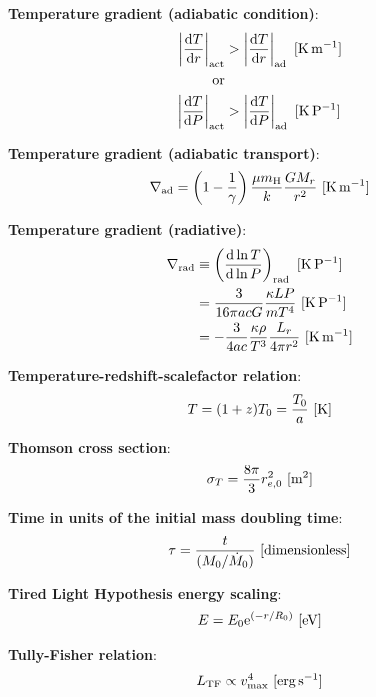 \documentclass[a4paper,10pt]{article}
\begin{document}
{\noindent}\textbf{Temperature gradient (adiabatic condition)}:
\begin{align*}
    \left\lvert\frac{{\rm d}T}{{\rm d}r}\right\rvert_{\rm act} &> \left\lvert\frac{{\rm d}T}{{\rm d}r}\right\rvert_{\rm ad} ~ [{\rm K\,m^{-1}}] \\
    {\rm or} \\
    \left\lvert\frac{{\rm d}T}{{\rm d}P}\right\rvert_{\rm act} &> \left\lvert\frac{{\rm d}T}{{\rm d}P}\right\rvert_{\rm ad} ~ [{\rm K\,P^{-1}}]
\end{align*}

{\noindent}\textbf{Temperature gradient (adiabatic transport)}:
\begin{align*}
    \nabla_{\rm ad} = \left(1-\frac{1}{\gamma}\right) \frac{\mu m_{\rm H}}{k}\frac{GM_r}{r^2} ~ [{\rm K\,m^{-1}}]
\end{align*}

{\noindent}\textbf{Temperature gradient (radiative)}:
\begin{align*}
    \nabla_{\rm rad} &\equiv \left(\frac{{\rm d}\ln T}{{\rm d}\ln P}\right)_{\rm rad} ~ [{\rm K\,P^{-1}}] \\
    &= \frac{3}{16\pi acG}\frac{\kappa LP}{mT^4} ~ [{\rm K\,P^{-1}}] \\
    &= -\frac{3}{4ac}\frac{\kappa\rho}{T^3}\frac{L_r}{4\pi r^2} ~ [{\rm K\,m^{-1}}]
\end{align*}

{\noindent}\textbf{Temperature-redshift-scalefactor relation}:
\begin{align*}
    T = (1+z)T_0 = \frac{T_0}{a} ~ [{\rm K}]
\end{align*}

{\noindent}\textbf{Thomson cross section}:
\begin{align*}
\sigma_T = \frac{8\pi}{3}r_{e,0}^2 ~ [{\rm m^2}]
\end{align*}

{\noindent}\textbf{Time in units of the initial mass doubling time}:
\begin{align*}
    \tau = \frac{t}{(M_0/\dot{M}_0)} ~ [{\rm dimensionless}]
\end{align*}

{\noindent}\textbf{Tired Light Hypothesis energy scaling}:
\begin{align*}
    E = E_0 \mathrm{e}^{(-r/R_0)} ~ [{\rm eV}]
\end{align*}

{\noindent}\textbf{Tully-Fisher relation}:
\begin{align*}
    L_\mathrm{TF} \propto v_\mathrm{max}^4 ~ [{\rm erg\,s^{-1}}]
\end{align*}
\end{document}
